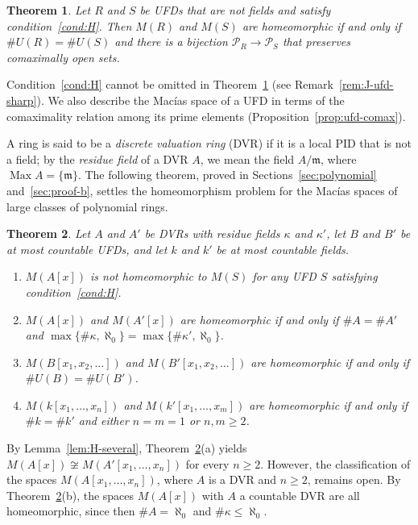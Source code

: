 \documentclass[12pt,reqno,a4paper]{amsart}
\newcommand{\Pe}{\mathcal{P}}
\newcommand{\m}{\mathfrak{m}}
\DeclareMathOperator{\Max}{Max}
\theoremstyle{plain}
\newtheorem{theorem}{Theorem}[section]
\theoremstyle{definition}
\begin{document}
\begin{theorem}\label{thm:ufd-iff}
Let $R$ and $S$ be UFDs that are not fields and satisfy condition~\ref{cond:H}. Then $M(R)$ and $M(S)$ are homeomorphic if and only if $\#U(R)=\#U(S)$ and there is a bijection $\Pe_R\to\Pe_S$ that preserves comaximally open sets.
\end{theorem}

Condition~\ref{cond:H} cannot be omitted in Theorem~\ref{thm:ufd-iff} (see Remark~\ref{rem:J-ufd-sharp}). We also describe the Mac\'ias space of a UFD in terms of the comaximality relation among its prime elements (Proposition~\ref{prop:ufd-comax}).

A ring is said to be a \emph{discrete valuation ring} (DVR) if it is a local PID that is not a field; by the \emph{residue field} of a DVR $A$, we mean the field $A/\m$, where $\Max A=\{\m\}$. The following theorem, proved in Sections~\ref{sec:polynomial} and~\ref{sec:proof-b}, settles the homeomorphism problem for the Mac\'ias spaces of large classes of polynomial rings.
\begin{theorem}\label{cor:polynomial}
Let $A$ and $A'$ be DVRs with residue fields $\kappa$ and $\kappa'$, let $B$ and $B'$ be at most countable UFDs, and let $k$ and $k'$ be at most countable fields.
\begin{enumerate}[label=\textup{(\alph*)}]
\item $M(A[x])$ is not homeomorphic to $M(S)$ for any UFD $S$ satisfying condition~\ref{cond:H}. 
\item $M(A[x])$ and $M(A'[x])$ are homeomorphic if and only if $\#A=\#A'$ and $\max\{\#\kappa,\aleph_0\}=\max\{\#\kappa',\aleph_0\}$.
\item $M(B[x_1,x_2,\dots])$ and $M(B'[x_1,x_2,\dots])$ are homeomorphic if and only if $\#U(B)=\#U(B')$.
\item $M(k[x_1,\dots,x_n])$ and $M(k'[x_1,\dots,x_m])$ are homeomorphic if and only if $\#k=\#k'$ and either $n=m=1$ or $n,m\geq2$.
\end{enumerate}
\end{theorem}

By Lemma~\ref{lem:H-several}, Theorem~\ref{cor:polynomial}(a) yields $M(A[x])\not\cong M(A'[x_1,\dots,x_n])$ for every $n\geq2$. However, the classification of the spaces $M(A[x_1,\dots,x_n])$, where $A$ is a DVR and $n\geq2$, remains open. By Theorem~\ref{cor:polynomial}(b), the spaces $M(A[x])$ with $A$ a countable DVR are all homeomorphic, since then $\#A=\aleph_0$ and $\#\kappa\leq\aleph_0$.
\end{document}
